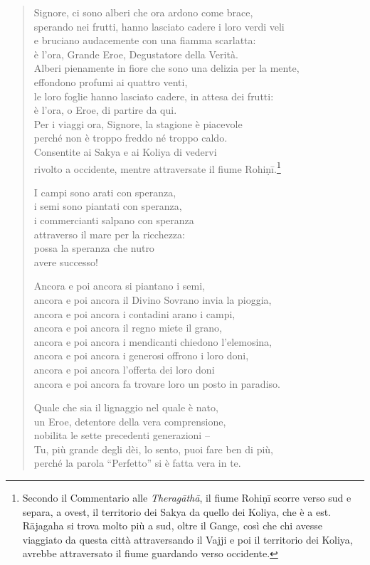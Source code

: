 \begin{quote}


Signore, ci sono alberi che ora ardono come brace, \\
sperando nei frutti, hanno lasciato cadere i loro verdi veli \\
e bruciano audacemente con una fiamma scarlatta: \\
è l’ora, Grande Eroe, Degustatore della Verità. \\
Alberi pienamente in fiore che sono una delizia per la mente, \\
effondono profumi ai quattro venti, \\
le loro foglie hanno lasciato cadere, in attesa dei frutti: \\
è l’ora, o Eroe, di partire da qui. \\
Per i viaggi ora, Signore, la stagione è piacevole \\
perché non è troppo freddo né troppo caldo. \\
Consentite ai Sakya e ai Koliya di vedervi \\
rivolto a occidente, mentre attraversate il fiume
Rohiṇī.\footnote{Secondo il Commentario alle \emph{Theragāthā}, il fiume Rohiṇī scorre verso sud e separa, a ovest, il territorio dei Sakya da quello dei Koliya, che è a est. Rājagaha si trova molto più a sud, oltre il Gange, così che chi avesse viaggiato da questa città attraversando il Vajji e poi il territorio dei Koliya, avrebbe attraversato il fiume guardando verso occidente.}


I campi sono arati con speranza, \\
i semi sono piantati con speranza, \\
i commercianti salpano con speranza \\
attraverso il mare per la ricchezza: \\
possa la speranza che nutro \\
avere successo!


Ancora e poi ancora si piantano i semi, \\
ancora e poi ancora il Divino Sovrano invia la pioggia, \\
ancora e poi ancora i contadini arano i campi, \\
ancora e poi ancora il regno miete il grano, \\
ancora e poi ancora i mendicanti chiedono l’elemosina, \\
ancora e poi ancora i generosi offrono i loro doni, \\
ancora e poi ancora l’offerta dei loro doni \\
ancora e poi ancora fa trovare loro un posto in paradiso.


Quale che sia il lignaggio nel quale è nato, \\
un Eroe, detentore della vera comprensione, \\
nobilita le sette precedenti generazioni – \\
Tu, più grande degli dèi, lo sento, puoi fare ben di più, \\
perché la parola “Perfetto” si è fatta vera in te.
\end{quote}

